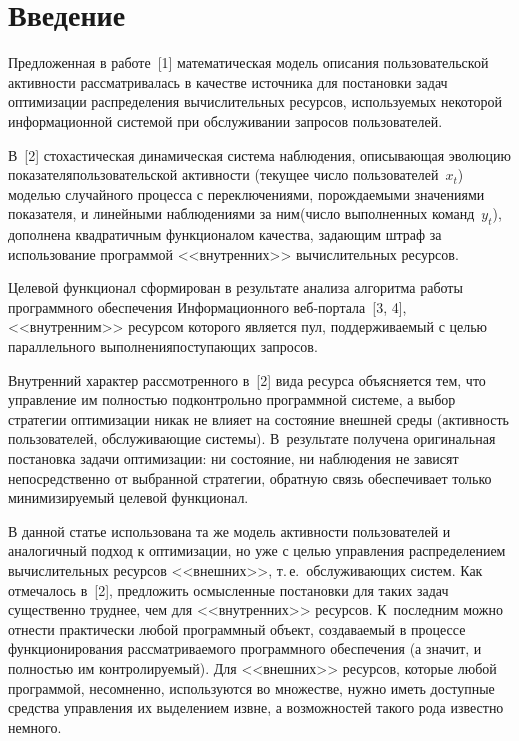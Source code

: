       \begin{multicols}{2}

            \label{st\stat}


\section{Введение}
  
  Предложенная в работе~[1] математическая модель описания пользовательской 
активности рассмат\-ри\-ва\-лась в качестве источника для постановки задач оптимизации 
распределения вычислительных ресурсов, используемых некоторой информационной 
системой при обслуживании запросов пользователей. 

В~[2] стохастическая динамическая 
система наблюдения, описывающая эволюцию показателя\linebreak пользовательской активности 
(текущее чис\-ло пользователей~$x_t$) моделью случайного процесса с переключениями, 
порождаемыми значениями показателя, и линейными наблюдениями за ним\linebreak (чис\-ло 
выполненных команд~$y_t$), дополнена квадратичным функционалом качества, задающим 
штраф за использование программой <<внутренних>> вы\-чис\-ли\-тель\-ных ресурсов. 

Целевой 
функционал сформирован в результате анализа алгоритма работы программного 
обеспечения Информационного веб-пор\-та\-ла~[3, 4], <<внут\-рен\-ним>> ресурсом которого 
является пул, поддерживаемый с целью параллельного выполнения\linebreak поступающих запросов.
  
  Внутренний характер рассмотренного в~[2] вида ресурса объясняется тем, что управление 
им полностью подконтрольно программной системе, а выбор стратегии оптимизации никак 
не влияет на состояние внешней среды (активность пользователей, обслуживающие 
системы). В~результате получена оригинальная постановка задачи оптимизации: ни 
состояние, ни наблюдения не зависят непосредственно от выбранной стратегии, обратную 
связь обеспечивает только минимизируемый целевой функционал.
  
  В данной статье использована та же модель активности пользователей и аналогичный 
подход к оптимизации, но уже с целью управления распределением вычислительных 
ресурсов <<внешних>>, т.\,е.\ обслуживающих систем. Как отмечалось в~[2], предложить 
осмысленные постановки для таких задач существенно труднее, чем для <<внутренних>> 
ресурсов. К~последним можно отнести практически любой программный объект, 
создаваемый в процессе функционирования рассматриваемого программного обеспечения (а 
значит, и полностью им контролируемый). Для <<внешних>> ресурсов, которые любой 
программой, несомненно, используются во множестве, нужно иметь доступные средства 
управления их выделением извне, а возможностей такого рода известно немного.
  

\end{multicols}
